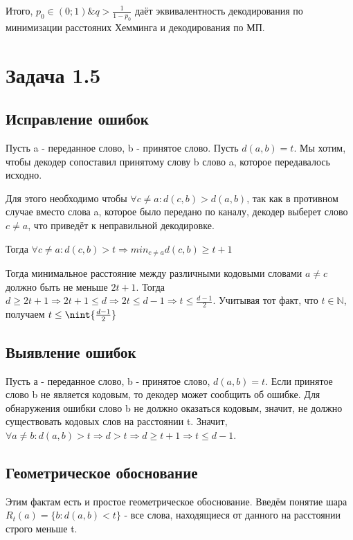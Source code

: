 \documentclass{article}
\DeclarePairedDelimiter{\nint}\lfloor\rfloor
\begin{document}
	  Итого, $p_0 \in (0; 1) \& q > \frac{1}{1 - p_0}$ даёт эквивалентность декодирования по минимизации расстояних Хемминга и декодирования по МП.
	  
	  \section{Задача 1.5}
	  
	  \subsection{Исправление ошибок}
	  Пусть a - переданное слово, b - принятое слово. Пусть $d(a, b) = t$. Мы хотим, чтобы декодер сопоставил принятому слову b слово a, которое передавалось исходно.
	  
	  Для этого необходимо чтобы $\forall c \neq a: d(c, b) > d(a, b)$, так как в противном случае вместо слова a, которое было передано по каналу, декодер выберет слово $c \neq a$, что приведёт к неправильной декодировке.
	  
	  Тогда $\forall c \neq a: d(c, b) > t \Rightarrow min_{c \neq a} d(c, b) \geq t + 1$
	  
	  Тогда минимальное расстояние между различными кодовыми словами $a \neq c$ должно быть не меньше $2t + 1$. Тогда $d \geq 2t + 1 \Rightarrow 2t + 1 \leq d \Rightarrow 2t \leq d - 1 \Rightarrow t \leq \frac{d - 1}{2}$. Учитывая тот факт, что $t \in \mathbb{N}$, получаем $t \leq \nint{\frac{d - 1}{2}}$
	  
	  \subsection{Выявление ошибок}
	  
	  Пусть а - переданное слово, b - принятое слово, $d(a, b) = t$. Если принятое слово b не является кодовым, то декодер может сообщить об ошибке. Для обнаружения ошибки слово b не должно оказаться кодовым, значит, не должно существовать кодовых слов на расстоянии t. Значит, $\forall a \neq b: d(a, b) > t \Rightarrow d > t \Rightarrow d \geq t + 1 \Rightarrow t \leq d - 1$. 
	  
	  \subsection{Геометрическое обоснование}
	  
	  Этим фактам есть и простое геометрическое обоснование. Введём понятие шара $R_t(a) = \{b: d(a, b) < t\}$ - все  слова, находящиеся от данного на расстоянии строго меньше t.
	  
\end{document}
